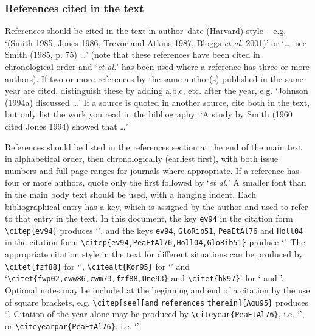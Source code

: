 \documentclass[]{tGIS2e}
\begin{document}
\subsubsection{References cited in the text} References should be cited in the text in  author--date (Harvard) style -- e.g. `(Smith 1985, Jones 1986, Trevor and Atkins 1987, Bloggs {\itshape{et al.}} 2001)' or `\ldots\,\, see Smith (1985, p. 75) \ldots' (note that these references have been cited in chronological order and `{\itshape{et al.}}' has been used where a reference has three or more authors). If two or more references by the same author(s) published in the same year are cited, distinguish these by adding a,b,c, etc. after the year, e.g. `Johnson (1994a) discussed \ldots' If a source is quoted in another source, cite both in the text, but only list the work you read in the bibliography: `A study by Smith (1960 cited Jones 1994) showed that \ldots'

References should be listed in the references section at the end of the main text in alphabetical order, then chronologically (earliest first), with both issue numbers and full page ranges for journals where appropriate. If a reference has four or more authors, quote only the first followed  by `{\itshape{et al.}}' A smaller font than in the main body text should be used, with a hanging indent. Each bibliographical entry has a key, which is assigned by the author and used to refer to that entry in the text. In this document, the key \verb"ev94" in the citation form \verb"\citep{ev94}" produces `\citep{ev94}', and the keys \verb"ev94", \verb"GloRib51", \verb"PeaEtAl76" and \verb"Holl04" in the citation form \verb"\citep{ev94,PeaEtAl76,Holl04,GloRib51}" produce `\citep{ev94,PeaEtAl76,Holl04,GloRib51}'. The appropriate citation style in the text for different situations can be produced by \verb"\citet{fzf88}" for `\citet{fzf88}', \verb"\citealt{Kor95}" for `\citealt{Kor95}' and `\verb"\citet{fwp02,cww86,cwm73,fzf88,Une93}" and \verb"\citet{hk97}"' for `\citet{fwp02,cww86,cwm73,fzf88,Une93} and \citet{hk97}'. Optional notes may be included at the beginning and end of a citation by the use of square brackets, e.g. \verb"\citep[see][and" \verb"references" \verb"therein]{Agu95}" produces `\citep[see][and references therein]{Agu95}'. Citation of the year alone may be produced by \verb"\citeyear{PeaEtAl76}", i.e. `\citeyear{PeaEtAl76}', or \verb"\citeyearpar{PeaEtAl76}", i.e. `\citeyearpar{PeaEtAl76}'.
\end{document}
